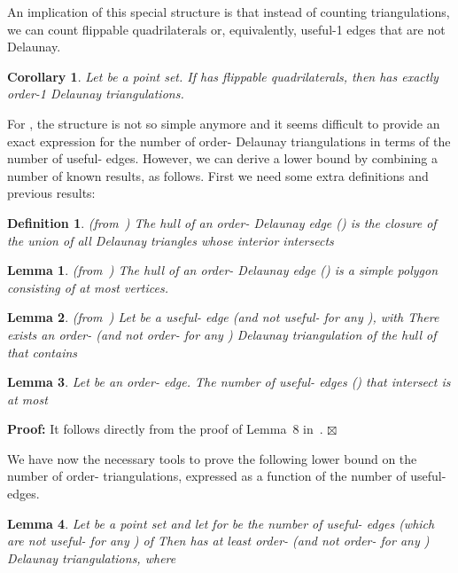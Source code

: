 \documentclass {journal}
\newtheorem {lemma} {Lemma}
\newtheorem {corollary} {Corollary}
\newtheorem {definition} {Definition}
\newenvironment {proof}{\textbf {Proof:}}{\hfill \ensuremath {\boxtimes}}
\begin{document}
An implication of this special structure is that instead of
counting triangulations, we can count flippable quadrilaterals or,
equivalently, useful-1 edges that are not Delaunay.

\begin{corollary}
\label{cor:flippable}
Let  be a point set. If  has  flippable quadrilaterals, then  has exactly  order-1 Delaunay triangulations.
\end{corollary}

For , the structure is not so simple anymore and it seems
difficult to provide an exact expression for the number of
order- Delaunay triangulations in terms of the number of
useful- edges. However, we can derive a lower bound by combining a number of known results, as follows.
First we need some extra
definitions and previous results:

\begin{definition}
(from~\cite{ghk-hodt-02}) The \emph{hull} of an order- Delaunay
edge  () is the closure of the union of
all Delaunay triangles whose interior intersects 
\end{definition}

\begin{lemma} \label{lem:sizehull}
(from~\cite{ghk-hodt-02}) The hull of an order- Delaunay edge
() is a simple polygon consisting of at most 
vertices.
\end{lemma}

\begin{lemma} \label{lem:trianghull}
(from~\cite{ghk-hodt-02}) Let  be a useful- edge
(and not useful- for any ), with  There exists
an order- (and not order- for any ) Delaunay
triangulation of the hull of  that contains

\end{lemma}

\begin{lemma} \label{lem:UsefkIntersOrder0}
Let  be an order- edge. The number of useful-
edges () that intersect  is at most

\end{lemma}

\begin{proof}
It follows directly from the proof of Lemma~8
in~\cite{ghk-hodt-02}.
\end{proof}


We have now the necessary tools to prove the following lower bound on the number of order- triangulations, expressed as a function of the number of useful- edges.

\begin{lemma}\label{lem:k_flippable}
Let  be a point set and let  for  be the number
of useful- edges (which are not useful- for any ) of
 Then  has at least  order- (and
not order- for any ) Delaunay triangulations, where

\end{lemma}
\end{document}
